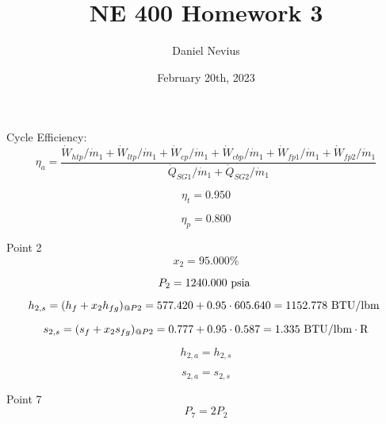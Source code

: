 \documentclass{article}
\title{NE 400 Homework 3}
\author{Daniel Nevius}
\date{February 20th, 2023}
\begin{document}
\maketitle

\section{}


Cycle Efficiency:
\begin{equation}
\eta_{a} = \frac{\dot{W}_{htp    } / \dot{m}_{1} + \dot{W}_{ltp    } / \dot{m}_{1} + \dot{W}_{cp     } / \dot{m}_{1} + \dot{W}_{cbp    } / \dot{m}_{1} + \dot{W}_{fp1    } / \dot{m}_{1} + \dot{W}_{fp2    } / \dot{m}_{1}}{\dot{Q}_{SG1    } / \dot{m}_{1} + \dot{Q}_{SG2    } / \dot{m}_{1}}
\end{equation}

\begin{equation}
\eta_{t} =    0.950
\end{equation}

\begin{equation}
\eta_{p} =    0.800
\end{equation}


Point 2
\begin{equation}
x_{ 2} =   95.000\%
\end{equation}

\begin{equation}
P_{ 2} = 1240.000\textnormal{ psia                      }
\end{equation}

\begin{equation}
  h_{ 2,s} = (h_{f} + x_{ 2}h_{fg})_{@P 2} =  577.420 + 0.95\cdot 605.640 = 1152.778
\textnormal{ BTU/lbm                   }
\end{equation}

\begin{equation}
  s_{ 2,s} = (s_{f} + x_{ 2}s_{fg})_{@P 2} =    0.777 + 0.95\cdot   0.587 =    1.335
\textnormal{ BTU/lbm}\cdot\textnormal{R}
\end{equation}

\begin{equation}
h_{ 2,a} = h_{ 2,s}
\end{equation}

\begin{equation}
s_{ 2,a} = s_{ 2,s}
\end{equation}


Point 7
\begin{equation}
P_7 = 2 P_2
\end{equation}
\end{document}

